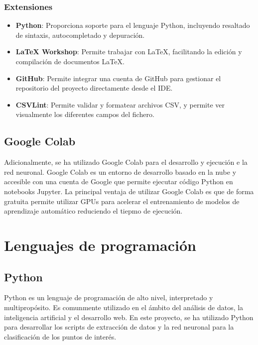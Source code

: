 \subsubsection{Extensiones}

\begin{itemize}
    
    \item \textbf{Python}: Proporciona soporte para el lenguaje Python, incluyendo resaltado de sintaxis, autocompletado y depuración.
    \item \textbf{LaTeX Workshop}: Permite trabajar con LaTeX, facilitando la edición y compilación de documentos LaTeX.
    \item \textbf{GitHub}: Permite integrar una cuenta de GitHub para gestionar el repositorio del proyecto directamente desde el IDE.
    \item \textbf{CSVLint}: Permite validar y formatear archivos CSV, y permite ver visualmente los diferentes campos del fichero.

\end{itemize}

\subsection{Google Colab}
Adicionalmente, se ha utilizado Google Colab para el desarrollo y ejecución e la red neuronal.
Google Colab es un entorno de desarrollo basado en la nube y accesible con una cuenta de Google que permite ejecutar código Python en notebooks Jupyter.
La principal ventaja de utilizar Google Colab es que de forma gratuita permite utilizar GPUs para acelerar el entrenamiento de modelos de aprendizaje automático reduciendo el tiepmo de ejecución.

\section {Lenguajes de programación}

\subsection{Python}

Python es un lenguaje de programación de alto nivel, interpretado y multipropósito.
Es comunmente utilizado en el ámbito del análisis de datos, la inteligencia artificial y el desarrollo web.
En este proyecto, se ha utilizado Python para desarrollar los scripts de extracción de datos y la red neuronal para la clasificación de los puntos de interés.

